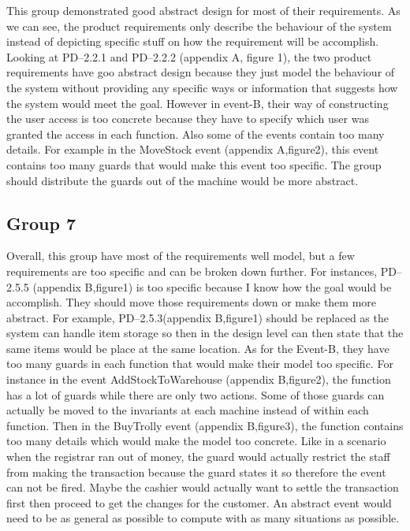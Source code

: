 This group demonstrated good abstract design for most of their requirements. As we can see, the product requirements only describe the behaviour of the system instead of depicting specific stuff on how the requirement will be accomplish. Looking at PD--2.2.1 and PD--2.2.2 (appendix A, figure 1), the two product requirements have goo abstract design because they just model the behaviour of the system without providing any specific ways or information that suggests how the system would meet the goal. However in event-B, their way of constructing the user access is too concrete because they have to specify which user was granted the access in each function. Also some of the events contain too many details. For example in the MoveStock event (appendix A,figure2), this event contains too many guards that would make this event too specific. The group should distribute the guards out of the machine would be more abstract. 

\subsection{Group 7}
\label{group7}

Overall, this group have most of the requirements well model, but a few requirements are too specific and can be broken down further. For instances, PD--2.5.5 (appendix B,figure1) is too specific because I know how the goal would be accomplish. They should move those requirements down or make them more abstract. For example, PD--2.5.3(appendix B,figure1) should be replaced as the system can handle item storage so then in the design level can then state that the same items would be place at the same location. As for the Event-B, they have too many guards in each function that would make their model too specific. For instance in the event AddStockToWarehouse (appendix B,figure2), the function has a lot of guards while there are only two actions. Some of those guards can actually be moved to the invariants at each machine instead of within each function. Then in the BuyTrolly event (appendix B,figure3), the function contains too many details which would make the model too concrete. Like in a scenario when the registrar ran out of money, the guard would actually restrict the staff from making the transaction because the guard states it so therefore the event can not be fired. Maybe the cashier would actually want to settle the transaction first then proceed to get the changes for the customer. An abstract event would need to be as general as possible to compute with as many situations as possible. 

